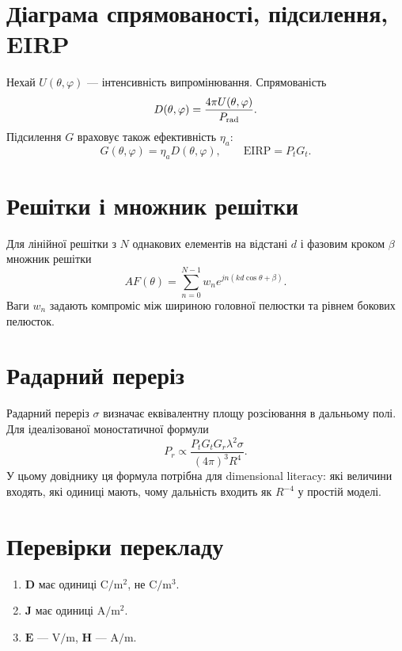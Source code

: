 \section{Діаграма спрямованості, підсилення, EIRP}

Нехай $U(\theta,\varphi)$ --- інтенсивність випромінювання. Спрямованість
\begin{equation}
 D(\theta,\varphi)=\frac{4\pi U(\theta,\varphi)}{P_{\rm rad}}.
\end{equation}
Підсилення $G$ враховує також ефективність $\eta_a$:
\begin{equation}
 G(\theta,\varphi)=\eta_a D(\theta,\varphi),\qquad \mathrm{EIRP}=P_tG_t.
\end{equation}

\section{Решітки і множник решітки}

Для лінійної решітки з $N$ однакових елементів на відстані $d$ і фазовим кроком $\beta$ множник решітки
\begin{equation}
 AF(\theta)=\sum_{n=0}^{N-1} w_n e^{jn(kd\cos\theta+\beta)}.
\end{equation}
Ваги $w_n$ задають компроміс між шириною головної пелюстки та рівнем бокових пелюсток.

\section{Радарний переріз}

Радарний переріз $\sigma$ визначає еквівалентну площу розсіювання в дальньому полі. Для ідеалізованої моностатичної формули
\begin{equation}
 P_r \propto \frac{P_t G_t G_r \lambda^2 \sigma}{(4\pi)^3 R^4}.
\end{equation}
У цьому довіднику ця формула потрібна для dimensional literacy: які величини входять, які одиниці мають, чому дальність входить як $R^{-4}$ у простій моделі.

\section{Перевірки перекладу}
\begin{enumerate}[label=\arabic*.]
  \item $\mathbf{D}$ має одиниці $\mathrm{C/m^2}$, не $\mathrm{C/m^3}$.
  \item $\mathbf{J}$ має одиниці $\mathrm{A/m^2}$.
  \item $\mathbf{E}$ --- $\mathrm{V/m}$, $\mathbf{H}$ --- $\mathrm{A/m}$.
\end{enumerate}
